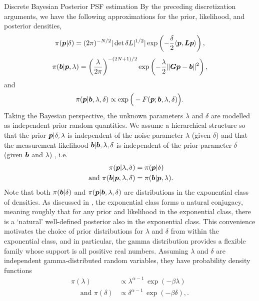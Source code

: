 \begin{chapter}{Discrete Bayesian Posterior PSF estimation}
By the preceding discretization arguments, we have the following approximations for the prior, likelihood, and posterior densities,
\begin{equation}\label{eq:discretePrior}
  \pi(\mbox{\boldmath$p$}| \delta) =(2\pi)^{-N/2} |\det \delta L|^{1/2}|\exp\left(-\frac \delta2 \langle \mbox{\boldmath$p$},\mbox{\boldmath$L$}\mbox{\boldmath$p$}\rangle\right),
\end{equation}
\begin{equation} \label{eq:discreteLiklihood}
  \pi(\mbox{\boldmath$b$} |\mbox{\boldmath$p$},\lambda) = \left(\frac{\lambda}{2\pi}  \right)^{-(2N+1)/2} \exp\left(-\frac \lambda2 \|\mbox{\boldmath$G$}\mbox{\boldmath$p$}-\mbox{\boldmath$b$}\|^2\right),
\end{equation}
and
\begin{equation}\label{eq:discretePosterior}
  \pi(\mbox{\boldmath$p$} | \mbox{\boldmath$b$},\lambda, \delta) \propto \exp\Big(-F(\mbox{\boldmath$p$};\mbox{\boldmath$b$},\lambda,\delta) \Big).
\end{equation}
Taking the Bayesian perspective, the unknown parameters $\lambda$ and $\delta$ are modelled as independent prior random quantities.
We assume a hierarchical structure so that the prior $\mbox{\boldmath$p$}|\delta,\lambda$ is independent of the noise parameter $\lambda$ (given $\delta$) and that the measurement likelihood $\mbox{\boldmath$b$}|\mbox{\boldmath$b$},\lambda,\delta$ is independent of the prior parameter $\delta$ (given $\mbox{\boldmath$b$}$ and $\lambda$) , i.e.
\begin{align}
  \pi(\mbox{\boldmath$p$}|\lambda,\delta) &= \pi(\mbox{\boldmath$p$}|\delta) \\
\text{ and } \pi(\mbox{\boldmath$b$}|\mbox{\boldmath$p$},\lambda,\delta) &= \pi(\mbox{\boldmath$b$}|\mbox{\boldmath$p$},\lambda).
\end{align}
Note that both $\pi(\mbox{\boldmath$b$}|\delta)$ and $\pi(\mbox{\boldmath$p$}|\mbox{\boldmath$b$},\lambda,\delta)$ are distributions in the exponential class of densities.
As discussed in \citep{gelman2014bayesian}, the exponential class forms a natural conjugacy, meaning roughly that for any prior and likelihood in the exponential class, there is a `natural' well-defined posterior also in the exponential class.
This convenience motivates the choice of prior distributions for $\lambda$ and $\delta$ from within the exponential class, and in particular, the gamma distribution provides a flexible family whose support is all positive real numbers.
Assuming $\lambda$ and $\delta$ are independent gamma-distributed random variables, they have probability density functions 
\begin{align} 
                \pi(\lambda) &\propto \lambda^{\alpha -1}\,\exp(-\beta\lambda)\label{eq:deltaPrior}\\
\quad\text{ and }\pi(\delta) &\propto \delta^{\alpha-1}\,\exp(-\beta\delta), \label{eq:lambdaPrior}.

\end{align}
\end{chapter}
